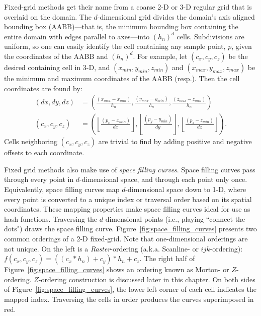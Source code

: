 \documentclass{report}
\begin{document}
Fixed-grid methods get their name from a coarse 2-D or 3-D regular grid that is overlaid on the domain. The $d$-dimensional grid divides the domain's axis aligned bounding box (AABB)---that is, the minimum bounding box containing the entire domain with edges parallel to axes---into $(h_n)^d$ cells. Subdivisions are uniform, so one can easily identify the cell containing any sample point, $p$, given the coordinates of the AABB and $(h_n)^d$. For example, let $(c_x, c_y, c_z)$ be the desired containing cell in 3-D, and $(x_{min}, y_{min}, z_{min})$ and $(x_{max}, y_{max}, z_{max})$ be the minimum and maximum coordinates of the AABB (resp.). Then the cell coordinates are found by:  
\begin{align}
(dx, dy, dz) & = \left(\frac{(x_{max} - x_{min})}{h_n}, \frac{(y_{max} - y_{min})}{h_n}, \frac{(z_{max} - z_{min})}{h_n}\right) \nonumber \\
(c_x, c_y, c_z) & = \left(\left\lfloor\frac{(p_x - x_{min})}{dx}\right\rfloor , \left\lfloor\frac{(p_y - y_{min})}{dy}\right\rfloor , \left\lfloor\frac{(p_z - z_{min})}{dz}\right\rfloor \right).
\label{eq:cell_hash}
\end{align}
Cells neighboring $(c_x, c_y, c_z)$ are trivial to find by adding positive and negative offsets to each coordinate. %

Fixed grid methods also make use of \emph{space filling curves}. Space filling curves pass through every point in $d$-dimensional space, and through each point only once. Equivalently, space filling curves map $d$-dimensional space down to 1-D, where every point is converted to a unique index or traversal order based on its spatial coordinates. These mapping properties make space filling curves ideal for use as hash functions. Traversing the $d$-dimensional points (i.e., playing ``connect the dots") draws the space filling curve. Figure~\ref{fig:space_filling_curves} presents two common orderings of a 2-D fixed-grid. Note that one-dimensional orderings are not unique. On the left is a \emph{Raster}-ordering (a.k.a. Scanline- or $ijk$-ordering): $f(c_x,c_y,c_z) = ((c_x * h_n) + c_y) * h_n + c_z$. The right half of Figure~\ref{fig:space_filling_curves} shows an ordering known as Morton- or $Z$-ordering. $Z$-ordering construction is discussed later in this chapter. On both sides of Figure~\ref{fig:space_filling_curves}, the lower left corner of each cell indicates the mapped index. Traversing the cells in order produces the curves superimposed in red. 
\end{document}
